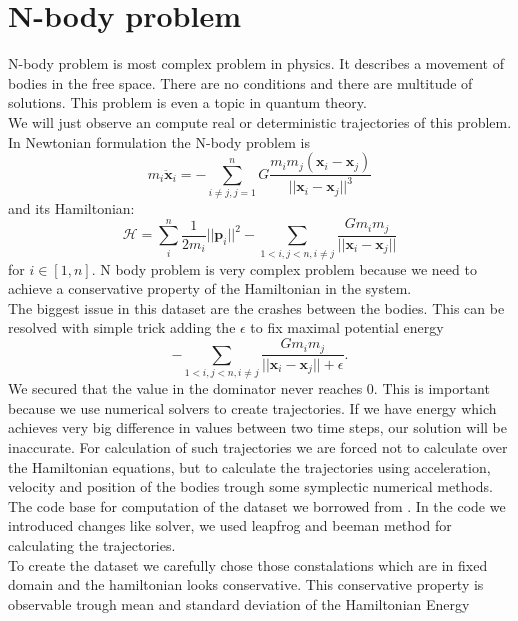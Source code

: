 \section{N-body problem}
N-body problem is most complex problem in physics. It describes a movement of bodies in the free space. There are no conditions and there are multitude of solutions. This problem is even a topic in quantum theory.\\ We will just observe an compute real or deterministic trajectories of this problem.\\ 
In Newtonian formulation the N-body problem is
\begin{equation}
m_i\ddot{\mathbf{x}}_i = -\sum_{i\neq j, j=1}^nG\frac{m_im_j(\mathbf{x}_i-\mathbf{x}_j)}{||\mathbf{x}_i-\mathbf{x}_j||^3}
\end{equation} 
and its Hamiltonian:
\begin{equation}
	\mathcal{H} =\sum_i^n \frac{1}{2m_i}||\mathbf{p}_i||^2 - \sum_{1<i,j<n,i\neq j}\frac{Gm_im_j}{||\mathbf{x}_i-\mathbf{x}_j||}
\end{equation} 
for $i \in[1,n].$
N body problem is very complex problem because we need to achieve a conservative property of the Hamiltonian in the system.\\
The biggest issue in this dataset are the crashes between the bodies.
This can be resolved with simple trick adding the $\epsilon$ to fix maximal potential energy
\begin{equation}
	- \sum_{1<i,j<n,i\neq j}\frac{Gm_im_j}{||\mathbf{x}_i-\mathbf{x}_j||+\epsilon}.
\end{equation}
We secured that the value in the dominator never reaches 0. This is important because we use numerical solvers to create trajectories. If we have energy which achieves very big difference in values between two time steps, our solution will be inaccurate.  For calculation of such trajectories we are forced not to calculate over the Hamiltonian equations, but to calculate the trajectories using acceleration, velocity and position of the bodies trough some symplectic numerical methods. The code base for computation of the dataset we borrowed from \cite{nb}. In the code we introduced changes like solver, we used leapfrog and beeman method for calculating the trajectories.\\
To create the dataset we carefully chose those constalations which are in fixed domain and the hamiltonian looks conservative. This conservative property is observable trough mean and standard deviation of the Hamiltonian Energy 
